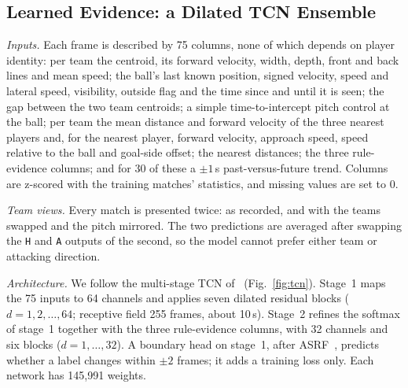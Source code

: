 \documentclass[conference]{IEEEtran}
\begin{document}
\subsection{Learned Evidence: a Dilated TCN Ensemble}
\label{sec:tcn}

\emph{Inputs.} Each frame is described by 75 columns, none of which depends on player identity: per team the centroid,
its forward velocity, width, depth, front and back lines and mean speed; the ball's last known position, signed
velocity, speed and lateral speed, visibility, outside flag and the time since and until it is seen; the gap
between the two team centroids; a simple time-to-intercept pitch control
at the ball; per team the mean distance and forward velocity of the three nearest players and, for the nearest
player, forward velocity, approach speed, speed relative to the ball and goal-side offset; the nearest distances; the
three rule-evidence columns; and for 30 of these a $\pm1$\,s past-versus-future trend. Columns are z-scored with the
training matches' statistics, and missing values are set to 0.

\emph{Team views.} Every match is presented twice: as recorded, and with the teams swapped and the pitch mirrored.
The two predictions are averaged after swapping the \texttt{H} and \texttt{A} outputs of the second, so the model
cannot prefer either team or attacking direction.

\emph{Architecture.} We follow the multi-stage TCN of~\cite{farha2019mstcn} (Fig.~\ref{fig:tcn}). Stage~1 maps
the 75 inputs to 64 channels and applies seven dilated residual blocks ($d=1,2,\dots,64$; receptive field 255
frames, about 10\,s). Stage~2 refines the softmax of stage~1 together with the three rule-evidence columns, with 32
channels and six blocks ($d=1,\dots,32$). A boundary head on stage~1, after ASRF~\cite{ishikawa2021asrf}, predicts
whether a label changes within $\pm2$ frames; it adds a training loss only. Each network has 145{,}991 weights.
\end{document}
